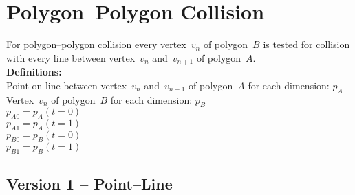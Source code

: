 \documentclass[a4paper,10pt]{scrartcl}
\begin{document}
\section{Polygon--Polygon Collision}

For polygon--polygon collision every vertex~$v_n$ of polygon~$B$ is tested for collision
with every line between vertex~$v_n$ and~$v_{n+1}$ of polygon~$A$.\\

\noindent
\textbf{Definitions:}\\

\noindent
Point on line between vertex~$v_n$ and~$v_{n+1}$ of polygon~$A$ for each dimension: $p_A$ \\
Vertex~$v_n$ of polygon~$B$ for each dimension: $p_B$ \\
$p_{A0} = p_A(t=0)$ \\
$p_{A1} = p_A(t=1)$ \\
$p_{B0} = p_B(t=0)$ \\
$p_{B1} = p_B(t=1)$ \\

\subsection{Version 1 -- Point--Line}
\end{document}
